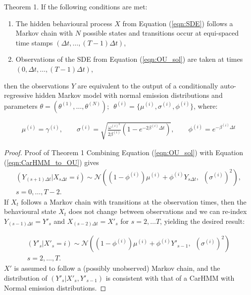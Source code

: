 \begin{theorem}{Theorem 1.}{}%
If the following conditions are met:
\begin{enumerate}
    \item The hidden behavioural process $X$ from Equation (\ref{eqn:SDE}) follows a Markov chain with $N$ possible states and transitions occur at equi-spaced time stamps $\left(\Delta t, \ldots, (T-1)\Delta t\right)$,
    
    \item Observations of the SDE from Equation (\ref{eqn:OU_sol}) are taken at times $\left(0, \Delta t, \ldots, (T-1)\Delta t\right)$,
\end{enumerate}
then the observations $Y$ are equivalent to the output of a conditionally auto-regressive hidden Markov model with normal emission distributions and parameters $\theta = (\theta^{(1)}, \ldots, \theta^{(N)}); \enspace \theta^{(i)} = \{\mu^{(i)},\sigma^{(i)},\phi^{(i)}\}$, where:

\begin{align}
\mu^{(i)} = \gamma^{(i)}, \qquad \sigma^{(i)} = \sqrt{\frac{\omega^{(i)^2}}{2\beta^{(i)}} (1-e^{-2\beta^{(i)}\Delta t})}, \qquad \phi^{(i)} = e^{-\beta^{(i)}\Delta t} \label{eqn:CarHMM_to_OU}
\end{align}

\end{theorem}

\begin{proof}{Proof of Theorem 1}{}
Combining Equation (\ref{eqn:OU_sol}) with Equation (\ref{eqn:CarHMM_to_OU}) gives
%
\begin{align*}
    \left(Y_{(s+1) \Delta t} | X_{s\Delta t} = i \right) \sim \mathcal{N}\left((1-\phi^{(i)}) \mu^{(i)} + \phi^{(i)} Y_{s \Delta t}, \enspace \left(\sigma^{(i)}\right)^2 \right),\\
    s = 0, \ldots, T-2.
\end{align*}
%
If $X_t$ follows a Markov chain with transitions at the observation times, then the behavioural state $X_t$ does not change between observations and we can re-index $Y_{(s-1) \Delta t} = Y'_s$ and $X_{(s-2)\Delta t} = X'_s$ for $s = 2,\ldots T$, yielding the desired result:

\begin{align*}
    \left(Y'_s| X'_s = i \right) \sim \mathcal{N}\left((1-\phi^{(i)}) \mu^{(i)} + \phi^{(i)} Y'_{s-1}, \enspace \left(\sigma^{(i)}\right)^2 \right)\\
    s = 2, \ldots, T.
\end{align*}
%
$X'$ is assumed to follow a (possibly unobserved) Markov chain, and the distribution of $(Y'_s|X'_s,Y'_{s-1})$ is consistent with that of a CarHMM with Normal emission distributions.
\end{proof}

